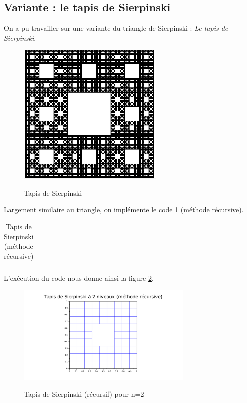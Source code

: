 \documentclass[a4paper,10pt]{report}
\begin{document}
\subsection{Variante : le tapis de Sierpinski}
On a pu travailler sur une variante du triangle de Sierpinski : \textit{Le tapis de Sierpinski}.
\begin{figure}[H]
\centering
\caption{Tapis de Sierpinski}
\includegraphics[width=7cm]{tapis.png}
\label{tapis_rec}
\end{figure}

Largement similaire au triangle, on implémente le code \ref{code_tapis_rec} (méthode récursive).

\begin{table}[H]
\caption{Tapis de Sierpinski (méthode récursive)}
\begin{tabular}{l}
\\
\end{tabular}
\label{code_tapis_rec}
\end{table}

L'exécution du code nous donne ainsi la figure \ref{tapis_rec}.
\begin{figure}[H]
\centering
\caption{Tapis de Sierpinski (récursif) pour n=2}
\includegraphics[width=0.75\textwidth]{tapis_recursif.pdf}
\label{tapis_rec}
\end{figure}
\end{document}
